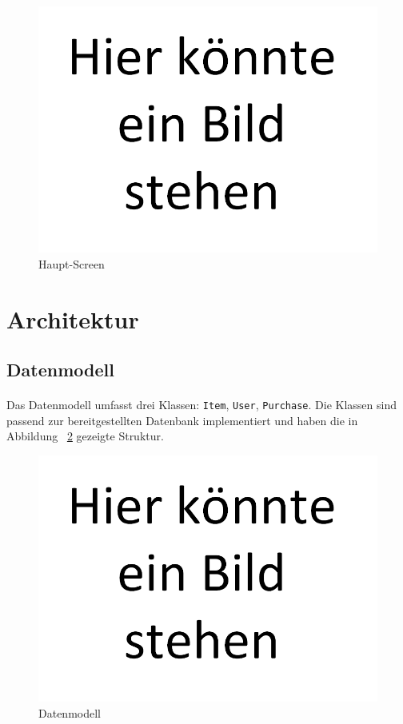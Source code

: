 \documentclass{scrartcl}
\begin{document}
		\begin{figure}[!h]
			\label{mainscreen}
			\centering
			\includegraphics[scale=0.5]{./figures/placeholder.png}
			\caption{Haupt-Screen}
		\end{figure}
		
	
	\section{Architektur} \label{architecture}
		\subsection{Datenmodell} \label{architecture.datamodel}
			\paragraph*{}
			Das Datenmodell umfasst drei Klassen: \texttt{Item}, \texttt{User}, \texttt{Purchase}. Die Klassen sind passend zur bereitgestellten Datenbank implementiert und haben die in Abbildung ~\ref{datamodel} gezeigte Struktur.
		
		\begin{figure}[!h]
			\label{datamodel}
			\centering
			\includegraphics[scale=0.5]{./figures/placeholder.png}
			\caption{Datenmodell}
		\end{figure}
		
\end{document}
